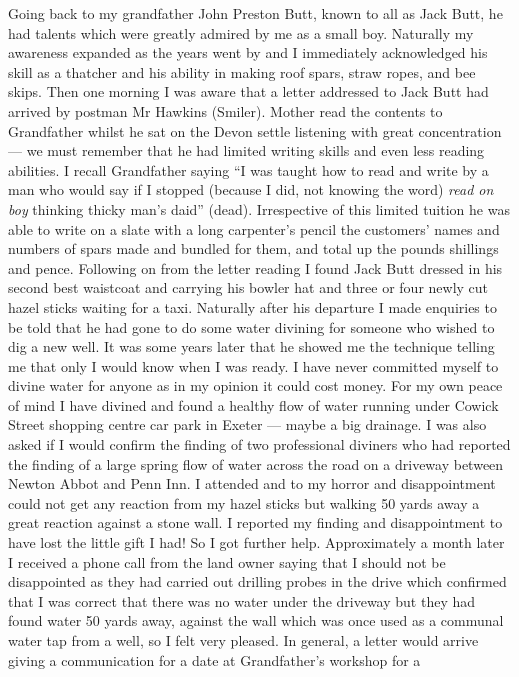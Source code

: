 Going back to my grandfather John Preston Butt, known to all as Jack Butt, he
had talents which were greatly admired by me as a small boy. Naturally my
awareness expanded as the years went by and I immediately acknowledged his
skill as a thatcher and his ability in making roof spars, straw ropes, and bee
skips. Then one morning I was aware that a letter addressed to Jack Butt had
arrived by postman Mr Hawkins (Smiler). Mother read the contents to Grandfather
whilst he sat on the Devon settle listening with great concentration --- we
must remember that he had limited writing skills and even less reading
abilities. I recall Grandfather saying ``I was taught how to read and write by
a man who would say if I stopped (because I did, not knowing the word)
\emph{read on boy} thinking thicky man's daid'' (dead). Irrespective of this
limited tuition he was able to write on a slate with a long carpenter's pencil
the customers' names and numbers of spars made and bundled for them, and total
up the pounds shillings and pence. Following on from the letter reading I
found Jack Butt dressed in his second best waistcoat and carrying his bowler
hat and three or four newly cut hazel sticks waiting for a taxi. Naturally
after his departure I made enquiries to be told that he had gone to do some
water divining for someone who wished to dig a new well. It was some years
later that he showed me the technique telling me that only I would know when I
was ready. I have never committed myself to divine water for anyone as in my
opinion it could cost money. For my own peace of mind I have divined and found
a healthy flow of water running under Cowick Street shopping centre car park
in Exeter --- maybe a big drainage. I was also asked if I would confirm the
finding of two professional diviners who had reported the finding of a large
spring flow of water across the road on a driveway between Newton Abbot and
Penn Inn. I attended and to my horror and disappointment could not get any
reaction from my hazel sticks but walking 50 yards away a great reaction
against a stone wall. I reported my finding and disappointment to have lost
the little gift I had! So I got further help. Approximately a month later I
received a phone call from the land owner saying that I should not be
disappointed as they had carried out drilling probes in the drive which
confirmed that I was correct that there was no water under the driveway but
they had found water 50 yards away, against the wall which was once used as a
communal water tap from a well, so I felt very pleased. In general, a letter
would arrive giving a communication for a date at Grandfather's workshop for a
